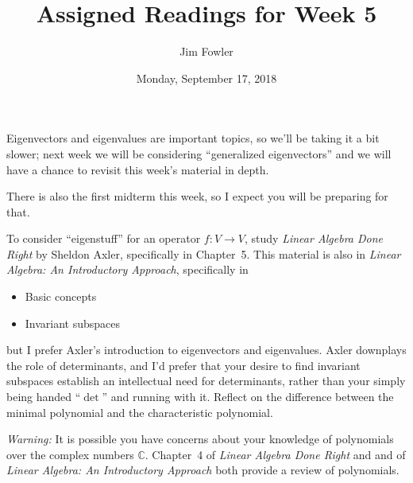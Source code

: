 \documentclass{homework}
\author{Jim Fowler}
\title{Assigned Readings for Week 5}
\date{Monday, September 17, 2018}
\begin{document}
\maketitle


Eigenvectors and eigenvalues are important topics, so we'll be taking
it a bit slower; next week we will be considering ``generalized
eigenvectors'' and we will have a chance to revisit this week's
material in depth.

There is also the first midterm this week, so I expect you will be
preparing for that.


To consider ``eigenstuff'' for an operator
$f : V \to V$, study \textit{Linear Algebra Done Right} by Sheldon
Axler, specifically in Chapter~5.  This material is also in
\textit{Linear Algebra: An Introductory Approach}, specifically in
\begin{itemize}
\item {} Basic concepts
\item {} Invariant subspaces
\end{itemize}
but I prefer Axler's introduction to eigenvectors and eigenvalues.
Axler downplays the role of determinants, and I'd prefer that your
desire to find invariant subspaces establish an intellectual need for
determinants, rather than your simply being handed ``$\det$'' and
running with it.  Reflect on the difference between the minimal
polynomial and the characteristic polynomial.

\textit{Warning:} It is possible you have concerns about your
knowledge of polynomials over the complex numbers $\mathbb{C}$.
Chapter~4 of \textit{Linear Algebra Done Right} and 
and  of \textit{Linear Algebra: An Introductory
  Approach} both provide a review of polynomials.
\end{document}
